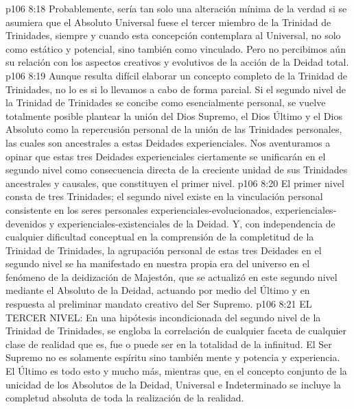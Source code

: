 \vs p106 8:18 Probablemente, sería tan solo una alteración mínima de la verdad si se asumiera que el Absoluto Universal fuese el tercer miembro de la Trinidad de Trinidades, siempre y cuando esta concepción contemplara al Universal, no solo como estático y potencial, sino también como vinculado. Pero no percibimos aún su relación con los aspectos creativos y evolutivos de la acción de la Deidad total.
\vs p106 8:19 Aunque resulta difícil elaborar un concepto completo de la Trinidad de Trinidades, no lo es si lo llevamos a cabo de forma parcial. Si el segundo nivel de la Trinidad de Trinidades se concibe como esencialmente personal, se vuelve totalmente posible plantear la unión del Dios Supremo, el Dios Último y el Dios Absoluto como la repercusión personal de la unión de las Trinidades personales, las cuales son ancestrales a estas Deidades experienciales. Nos aventuramos a opinar que estas tres Deidades experienciales ciertamente se unificarán en el segundo nivel como consecuencia directa de la creciente unidad de sus Trinidades ancestrales y causales, que constituyen el primer nivel.
\vs p106 8:20 El primer nivel consta de tres Trinidades; el segundo nivel existe en la vinculación personal consistente en los seres personales experienciales\hyp{}evolucionados, experienciales\hyp{}devenidos y experienciales\hyp{}existenciales de la Deidad. Y, con independencia de cualquier dificultad conceptual en la comprensión de la completitud de la Trinidad de Trinidades, la agrupación personal de estas tres Deidades en el segundo nivel se ha manifestado en nuestra propia era del universo en el fenómeno de la deidización de Majestón, que se actualizó en este segundo nivel mediante el Absoluto de la Deidad, actuando por medio del Último y en respuesta al preliminar mandato creativo del Ser Supremo.
\vs p106 8:21 EL TERCER NIVEL: En una hipótesis incondicionada del segundo nivel de la Trinidad de Trinidades, se engloba la correlación de cualquier faceta de cualquier clase de realidad que es, fue o puede ser en la totalidad de la infinitud. El Ser Supremo no es solamente espíritu sino también mente y potencia y experiencia. El Último es todo esto y mucho más, mientras que, en el concepto conjunto de la unicidad de los Absolutos de la Deidad, Universal e Indeterminado se incluye la completud absoluta de toda la realización de la realidad.
